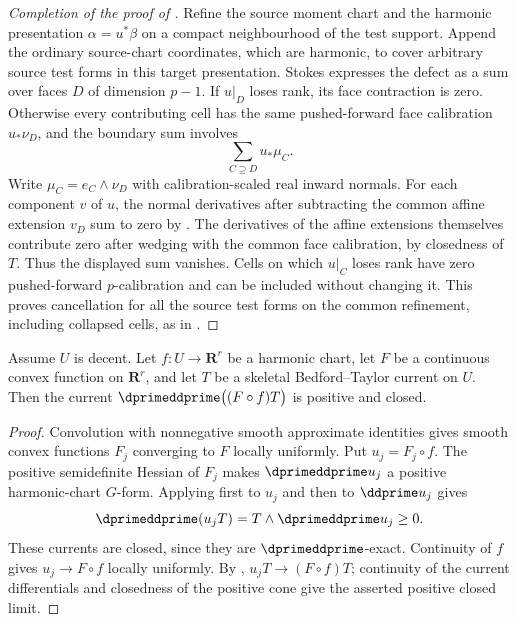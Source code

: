 \begin{proof}[Completion of the proof of
]
Refine the source moment chart and the harmonic presentation
$\alpha=u^*\beta$ on a compact neighbourhood of the test support.
Append the ordinary source-chart coordinates, which are harmonic, to
cover arbitrary source test forms in this target presentation.
Stokes expresses the defect as a sum over faces $D$ of dimension $p-1$.
If $u|_D$ loses rank, its face contraction is zero.  Otherwise every
contributing cell has the same pushed-forward face calibration
$u_*\nu_D$, and the boundary sum involves
\[
                  \sum_{C\supseteq D}u_*\mu_C.
\]
Write $\mu_C=e_C\wedge\nu_D$ with calibration-scaled real inward
normals.  For each component $v$ of $u$, the normal derivatives after
subtracting the common affine extension $v_D$ sum to zero by
.  The derivatives of the affine
extensions themselves contribute zero after wedging with the common
face calibration, by closedness of $T$.  Thus the displayed sum vanishes.
Cells on which $u|_C$ loses rank have zero pushed-forward $p$-calibration
and can be included without changing it.  This proves cancellation for
all the source test forms on the common refinement, including collapsed
cells, as in \cite[Proposition~8.11.1]{CLD25}.
\end{proof}

\begin{corollary}
\label{cor:ch16-harmonic-convex-positive}
Assume $U$ is decent.  Let $f:U\to\mathbf R^r$ be a harmonic chart,
let $F$ be a continuous
convex function on $\mathbf R^r$, and let $T$ be a skeletal Bedford--Taylor
current on $U$.  Then the current
$\dprimeddprime\bigl((F\circ f)T\bigr)$ is positive and closed.
\end{corollary}
\begin{proof}
Convolution with nonnegative smooth approximate identities gives smooth
convex functions $F_j$ converging to $F$ locally uniformly.  Put
$u_j=F_j\circ f$.  The positive semidefinite Hessian of $F_j$ makes
$\dprimeddprime u_j$ a positive harmonic-chart $G$-form.  Applying
 first to $u_j$ and then to
$\ddprime u_j$ gives
\[
 \dprimeddprime(u_jT)=T\wedge\dprimeddprime u_j\geq0.
\]
These currents are closed, since they are $\dprimeddprime$-exact.
Continuity of $f$ gives $u_j\to F\circ f$ locally uniformly.  By
, $u_jT\to(F\circ f)T$;
continuity of the current differentials and closedness of the positive cone
give the asserted positive closed limit.
\end{proof}

